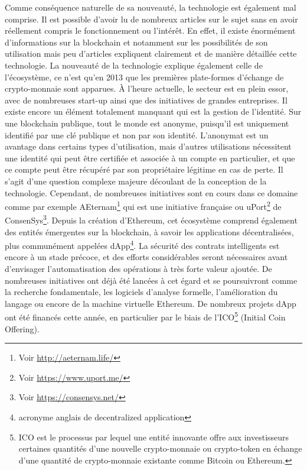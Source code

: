 \documentclass{tnreport}
\begin{document}
Comme conséquence naturelle de sa nouveauté, la technologie est également mal comprise.
Il est possible d'avoir lu de nombreux articles sur le sujet sans en avoir réellement compris le fonctionnement ou l'intérêt.
En effet, il existe énormément d'informations sur la blockchain et notamment sur les possibilités de son utilisation mais peu d'articles expliquent clairement et de manière détaillée cette technologie.
La nouveauté de la technologie explique également celle de l'écosystème, ce n'est qu'en 2013 que les premières plate-formes d'échange de crypto-monnaie sont apparues.
À l'heure actuelle, le secteur est en plein essor, avec de nombreuses start-up ainsi que des initiatives de grandes entreprises.
Il existe encore un élément totalement manquant qui est la gestion de l'identité.
Sur une blockchain publique, tout le monde est anonyme, puisqu'il est uniquement identifié par une clé publique et non par son identité.
L'anonymat est un avantage dans certains types d'utilisation, mais d'autres utilisations nécessitent une identité qui peut être certifiée et associée à un compte en particulier, et que ce compte peut être récupéré par son propriétaire légitime en cas de perte.
Il s'agit d'une question complexe majeure découlant de la conception de la technologie. Cependant, de nombreuses initiatives sont en cours dans ce domaine comme par exemple AEternam\footnote{Voir \url{http://aeternam.life/}} qui est une initiative française ou uPort\footnote{Voir \url{https://www.uport.me/}} de ConsenSys\footnote{Voir \url{https://consensys.net/}}.
Depuis la création d'Ethereum, cet écosystème comprend également des entités émergentes sur la blockchain, à savoir les applications décentralisées, plus communément appelées dApp\footnote{acronyme anglais de decentralized application}.
La sécurité des contrats intelligents est encore à un stade précoce, et des efforts considérables seront nécessaires avant d'envisager l'automatisation des opérations à très forte valeur ajoutée.
De nombreuses initiatives ont déjà été lancées à cet égard et se poursuivront comme la recherche fondamentale, les logiciels d'analyse formelle, l'amélioration du langage ou encore de la machine virtuelle Ethereum.
De nombreux projets dApp ont été financés cette année, en particulier par le biais de l'ICO\footnote{
ICO est le processus par lequel une entité innovante offre aux investisseurs certaines quantités d'une nouvelle crypto-monnaie ou crypto-token en échange d'une quantité de crypto-monnaie existante comme Bitcoin ou Ethereum.} (Initial Coin Offering).
\end{document}
